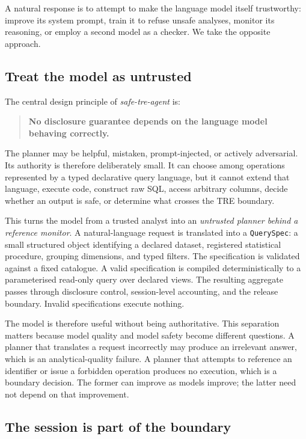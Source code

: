 \documentclass[11pt,a4paper]{article}
\begin{document}
A natural response is to attempt to make the language model itself trustworthy:
improve its system prompt, train it to refuse unsafe analyses, monitor its
reasoning, or employ a second model as a checker. We take the opposite approach.

\subsection{Treat the model as untrusted}
\label{sec:untrusted}

The central design principle of \textit{safe-tre-agent} is:

\begin{quote}
\textbf{No disclosure guarantee depends on the language model behaving
correctly.}
\end{quote}

The planner may be helpful, mistaken, prompt-injected, or actively adversarial.
Its authority is therefore deliberately small. It can choose among operations
represented by a typed declarative query language, but it cannot extend that
language, execute code, construct raw SQL, access arbitrary columns, decide
whether an output is safe, or determine what crosses the TRE boundary.

This turns the model from a trusted analyst into an \emph{untrusted planner
behind a reference monitor}. A natural-language request is translated into a
\texttt{QuerySpec}: a small structured object identifying a declared dataset,
registered statistical procedure, grouping dimensions, and typed filters. The
specification is validated against a fixed catalogue. A valid specification is
compiled deterministically to a parameterised read-only query over declared
views. The resulting aggregate passes through disclosure control,
session-level accounting, and the release boundary. Invalid specifications
execute nothing.

The model is therefore useful without being authoritative. This separation
matters because model quality and model safety become different questions. A
planner that translates a request incorrectly may produce an irrelevant answer,
which is an analytical-quality failure. A planner that attempts to reference an
identifier or issue a forbidden operation produces no execution, which is a
boundary decision. The former can improve as models improve; the latter need
not depend on that improvement.

\subsection{The session is part of the boundary}
\label{sec:session-intro}
\end{document}
